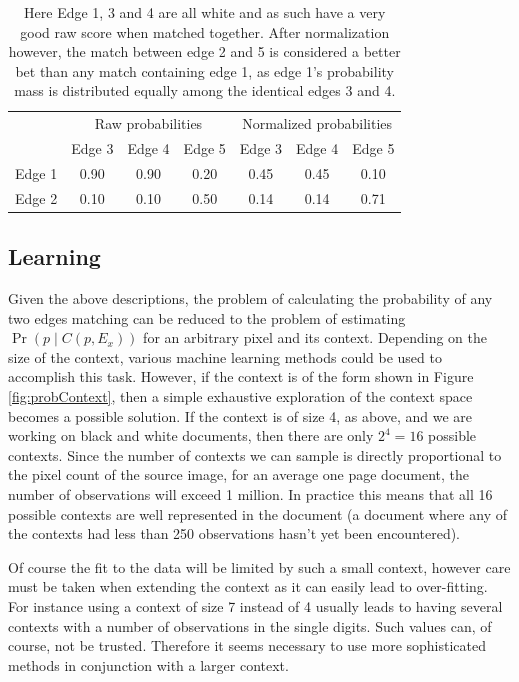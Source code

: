 \begin{table}[h]
  \centering
  \begin{tabular}{|c|c|c|c|c|c|c|}
    \hline
    & \multicolumn{3}{|c|}{Raw probabilities} &  \multicolumn{3}{|c|}{Normalized probabilities} \\
    \cline{2-7}
    & Edge 3 & Edge 4 & Edge 5 & Edge 3 & Edge 4 & Edge 5 \\
    \hline
    Edge 1 & 0.90 & 0.90 & 0.20 & 0.45 & 0.45 & 0.10 \\
    \hline
    Edge 2 & 0.10 & 0.10 & 0.50 & 0.14 & 0.14 & 0.71 \\
    \hline
  \end{tabular}
  \caption{Here Edge 1, 3 and 4 are all white and as such have a very good raw score when matched together. After normalization however, the match between edge 2 and 5 is considered a better bet than any match containing edge 1, as edge 1's probability mass is distributed equally among the identical edges 3 and 4.}
  \label{tab:normalization}
\end{table}

\subsection{Learning}
Given the above descriptions, the problem of calculating the probability of any two edges matching can be reduced to the problem of estimating \(\Pr( p \mid C(p,E_x) )\) for an arbitrary pixel and its context. Depending on the size of the context, various machine learning methods could be used to accomplish this task. However, if the context is of the form shown in Figure \ref{fig:probContext}, then a simple exhaustive exploration of the context space becomes a possible solution. If the context is of size 4, as above, and we are working on black and white documents, then there are only \(2^4 = 16\) possible contexts. Since the number of contexts we can sample is directly proportional to the pixel count of the source image, for an average one page document, the number of observations will exceed 1 million. In practice this means that all 16 possible contexts are well represented in the document (a document where any of the contexts had less than 250 observations hasn't yet been encountered).

Of course the fit to the data will be limited by such a small context, however care must be taken when extending the context as it can easily lead to over-fitting. For instance using a context of size 7 instead of 4 usually leads to having several contexts with a number of observations in the single digits. Such values can, of course, not be trusted. Therefore it seems necessary to use more sophisticated methods in conjunction with a larger context. 


